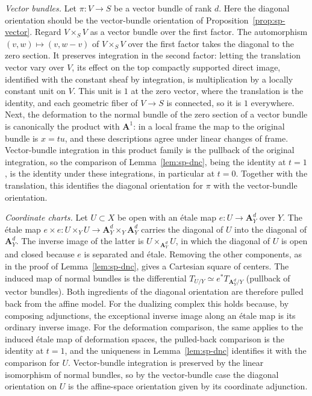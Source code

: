 \documentclass[11pt,a4paper]{article}
\numberwithin{equation}{section}
\theoremstyle{definition}
\theoremstyle{remark}
\begin{document}
\emph{Vector bundles.} Let $\pi:V\to S$ be a vector bundle of rank $d$.
Here the diagonal orientation should be the vector-bundle orientation of
Proposition~\ref{prop:sp-vector}. Regard $V\times_SV$ as a vector bundle
over the first factor. The automorphism $(v,w)\mapsto(v,w-v)$ of
$V\times_SV$ over the first factor takes the diagonal to the zero
section. It preserves integration in the second factor: letting the
translation vector vary over $V$, its effect on the top compactly
supported direct image, identified with the constant sheaf by
integration, is multiplication by a locally constant unit on $V$. This
unit is $1$ at the zero vector, where the translation is the identity,
and each geometric fiber of $V\to S$ is connected, so it is $1$
everywhere. Next, the deformation to the normal bundle of the zero
section of a vector bundle is canonically the product with
$\mathbf A^1$: in a local frame the map to the original bundle is
$x=tu$, and these descriptions agree under linear changes of frame.
Vector-bundle integration in this product family is the pullback of the
original integration, so the comparison of Lemma~\ref{lem:sp-dnc},
being the identity at $t=1$, is the identity under these integrations,
in particular at $t=0$. Together with the translation, this identifies
the diagonal orientation for $\pi$ with the vector-bundle orientation.

\emph{Coordinate charts.} Let $U\subset X$ be open with an \'etale map
$e:U\to\mathbf A^d_Y$ over $Y$. The \'etale map
$e\times e:U\times_YU\to\mathbf A^d_Y\times_Y\mathbf A^d_Y$ carries the
diagonal of $U$ into the diagonal of $\mathbf A^d_Y$. The inverse image
of the latter is $U\times_{\mathbf A^d_Y}U$, in which the diagonal of
$U$ is open and closed because $e$ is separated and \'etale. Removing
the other components, as in the proof of Lemma~\ref{lem:sp-dnc}, gives
a Cartesian square of centers. The induced map of normal bundles is the
differential $T_{U/Y}\simeq e^*T_{\mathbf A^d_Y/Y}$ (pullback of vector
bundles). Both ingredients of the diagonal orientation are therefore
pulled back from the affine model. For the dualizing complex this holds
because, by composing adjunctions, the exceptional inverse image along
an \'etale map is its ordinary inverse image. For the deformation
comparison, the same applies to the induced \'etale map of deformation
spaces, the pulled-back comparison is the identity at $t=1$, and the
uniqueness in Lemma~\ref{lem:sp-dnc} identifies it with the comparison
for $U$. Vector-bundle integration is preserved by the linear
isomorphism of normal bundles, so by the vector-bundle case the diagonal
orientation on $U$ is the affine-space orientation given by its
coordinate adjunction.
\end{document}
